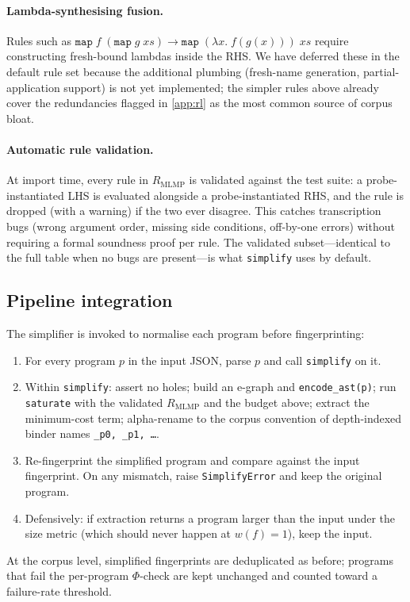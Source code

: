 \documentclass[12pt]{article}
\begin{document}
\paragraph{Lambda-synthesising fusion.} Rules such as $\mathtt{map}\;f\;(\mathtt{map}\;g\;\mathit{xs}) \to \mathtt{map}\;(\lambda x.\;f(g(x)))\;\mathit{xs}$ require constructing fresh-bound lambdas inside the RHS. We have deferred these in the default rule set because the additional plumbing (fresh-name generation, partial-application support) is not yet implemented; the simpler rules above already cover the redundancies flagged in \cref{app:rl} as the most common source of corpus bloat.

\paragraph{Automatic rule validation.} At import time, every rule in $R_{\text{MLMP}}$ is validated against the test suite: a probe-instantiated LHS is evaluated alongside a probe-instantiated RHS, and the rule is dropped (with a warning) if the two ever disagree. This catches transcription bugs (wrong argument order, missing side conditions, off-by-one errors) without requiring a formal soundness proof per rule. The validated subset---identical to the full table when no bugs are present---is what \texttt{simplify} uses by default.

\subsection{Pipeline integration}\label{app:simp-integration}

The simplifier is invoked to normalise each program before fingerprinting:
\begin{enumerate}
  \item For every program $p$ in the input JSON, parse $p$ and call \texttt{simplify} on it.
  \item Within \texttt{simplify}: assert no holes; build an e-graph and \texttt{encode\_ast(p)}; run \texttt{saturate} with the validated $R_{\text{MLMP}}$ and the budget above; extract the minimum-cost term; alpha-rename to the corpus convention of depth-indexed binder names \texttt{\_p0, \_p1, \ldots}.
  \item Re-fingerprint the simplified program and compare against the input fingerprint. On any mismatch, raise \texttt{SimplifyError} and keep the original program.
  \item Defensively: if extraction returns a program larger than the input under the size metric (which should never happen at $w(f) = 1$), keep the input.
\end{enumerate}
At the corpus level, simplified fingerprints are deduplicated as before; programs that fail the per-program $\Phi$-check are kept unchanged and counted toward a failure-rate threshold.
\end{document}
